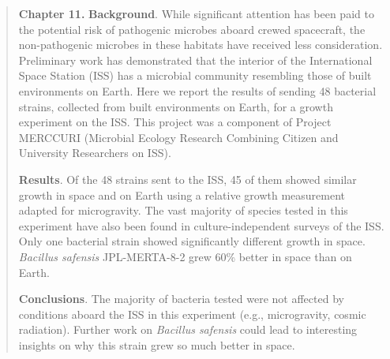 \begin{quote}

\noindent\textbf{Chapter 11.} \textbf{Background}. While significant attention
has been paid to the potential risk of pathogenic microbes aboard crewed
spacecraft, the non-pathogenic microbes in these habitats have received less
consideration. Preliminary work has demonstrated that the interior of the
International Space Station (ISS) has a microbial community resembling those
of built environments on Earth. Here we report the results of sending 48
bacterial strains, collected from built environments on Earth, for a growth
experiment on the ISS. This project was a component of Project MERCCURI
(Microbial Ecology Research Combining Citizen and University Researchers on
ISS).

\textbf{Results}. Of the 48 strains sent to the ISS, 45 of them showed similar
growth in space and on Earth using a relative growth measurement adapted for
microgravity. The vast majority of species tested in this experiment have also
been found in culture-independent surveys of the ISS. Only one bacterial
strain showed significantly different growth in space. {\em Bacillus safensis}
JPL-MERTA-8-2 grew 60\% better in space than on Earth.

\textbf{Conclusions}. The majority of bacteria tested were not affected by
conditions aboard the ISS in this experiment (e.g., microgravity, cosmic
radiation). Further work on {\em Bacillus safensis} could lead to interesting
insights on why this strain grew so much better in space.
\end{quote}

\printbibliography[heading=subbibliography]